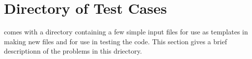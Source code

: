 
\section{Directory of Test Cases}
\label{Test Directory}

\parflow{} comes with a directory containing a few simple input files for use
as templates in making new files and for use in testing the code.  This section
gives a brief descriptionn of the problems in this driectory.
